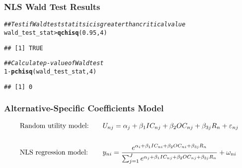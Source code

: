\documentclass{beamer}\usepackage[]{graphicx}\usepackage[]{color}
\makeatletter
\newcommand{\hlnum}[1]{\textcolor[rgb]{0.686,0.059,0.569}{#1}}%
\newcommand{\hlcom}[1]{\textcolor[rgb]{0.678,0.584,0.686}{\textit{#1}}}%
\newcommand{\hlopt}[1]{\textcolor[rgb]{0,0,0}{#1}}%
\newcommand{\hlstd}[1]{\textcolor[rgb]{0.345,0.345,0.345}{#1}}%
\newcommand{\hlkwd}[1]{\textcolor[rgb]{0.737,0.353,0.396}{\textbf{#1}}}%
\newenvironment{kframe}{%
 \def\at@end@of@kframe{}%
 \ifinner\ifhmode%
  \def\at@end@of@kframe{\end{minipage}}%
  \begin{minipage}{\columnwidth}%
 \fi\fi%
 \def\FrameCommand##1{\hskip\@totalleftmargin \hskip-\fboxsep
 \colorbox{shadecolor}{##1}\hskip-\fboxsep
     \hskip-\linewidth \hskip-\@totalleftmargin \hskip\columnwidth}%
 \MakeFramed {\advance\hsize-\width
   \@totalleftmargin\z@ \linewidth\hsize
   \@setminipage}}%
 {\par\unskip\endMakeFramed%
 \at@end@of@kframe}
\newenvironment{knitrout}{}{} %
\makeatother
\begin{document}
\begin{frame}[fragile]\frametitle{NLS Wald Test Results}
\begin{knitrout}\footnotesize
{}\color{fgcolor}\begin{kframe}
\begin{alltt}
\hlcom{## Test if Wald test statitsic is greater than critical value}
\hlstd{wald_test_stat} \hlopt{>} \hlkwd{qchisq}\hlstd{(}\hlnum{0.95}\hlstd{,} \hlnum{4}\hlstd{)}
\end{alltt}
\begin{verbatim}
## [1] TRUE
\end{verbatim}
\begin{alltt}
\hlcom{## Calculate p-value of Wald test}
\hlnum{1} \hlopt{-} \hlkwd{pchisq}\hlstd{(wald_test_stat,} \hlnum{4}\hlstd{)}
\end{alltt}
\begin{verbatim}
## [1] 0
\end{verbatim}
\end{kframe}
\end{knitrout}
\end{frame}

\begin{frame}\frametitle{Alternative-Specific Coefficients Model}
    \begin{alignat*}{2}
    &\text{Random utility model:} \quad &&U_{nj} = \alpha_j + \beta_1 IC_{nj} + \beta_2 OC_{nj} + \beta_{3j} R_n + \varepsilon_{nj} \\
    \intertext{}
    &\text{NLS regression model:} \quad &&y_{ni} =  \frac{e^{ \alpha_i + \beta_1 IC_{ni} + \beta_2 OC_{ni} + \beta_{3j} R_n}}{\sum_{j = 1}^J e^{ \alpha_j + \beta_1 IC_{nj} + \beta_2 OC_{nj} + \beta_{3j} R_n}} + \omega_{ni}
    \end{alignat*}
\end{frame}
\end{document}
